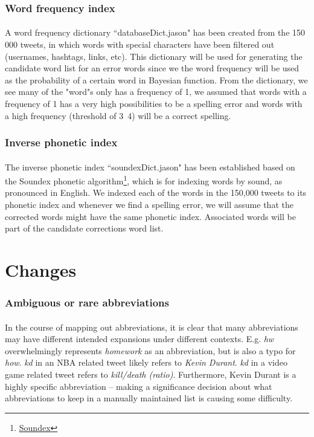 \documentclass{article}
\begin{document}
\subsubsection*{Word frequency index}
\paragraph{} A word frequency dictionary ``databaseDict.jason" has been created from the 150 000 tweets, in which words with special characters have been filtered out (usernames, hashtags, links, etc). This dictionary will be used for generating the candidate word list for an error words since we the word frequency will be used as the probability of a certain word in Bayesian function. From the dictionary, we see many of the "word"s only has a frequency of 1, we assumed that words with a frequency of 1 has a very high possibilities to be a spelling error and words with a high frequency (threshold of 3~4) will be a correct spelling.     
\subsubsection*{Inverse phonetic index}
\paragraph{} The inverse phonetic index ``soundexDict.jason" has been established based on the Soundex phonetic algorithm\footnote{\href{http://en.wikipedia.org/wiki/Soundex}{Soundex}}, which is for indexing words by sound, as pronounced in English. We indexed each of the words in the 150,000 tweets to its phonetic index and whenever we find a spelling error, we will assume that the corrected words might have the same phonetic index. Associated words will be part of the candidate corrections word list.
\section*{Changes}
\subsubsection*{Ambiguous or rare abbreviations}
\paragraph{}In the course of mapping out abbreviations, it is clear that many abbreviations may have different intended expansions under different contexts. E.g. \textit{hw} overwhelmingly represents \textit{homework} as an abbreviation, but is also a typo for \textit{how}. \textit{kd} in an NBA related tweet likely refers to \textit{Kevin Durant}. \textit{kd} in a video game related tweet refers to \textit{kill/death (ratio)}. Furthermore, Kevin Durant is a highly specific abbreviation -- making a significance decision about what abbreviations to keep in a manually maintained list is causing some difficulty. 
\end{document}
